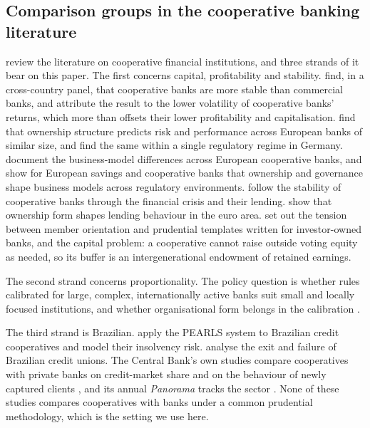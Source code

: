 \documentclass[11pt,a4paper]{article}
\begin{document}
\subsection{Comparison groups in the cooperative banking literature}

\citet{mckillop2020} review the literature on cooperative financial institutions, and
three strands of it bear on this paper. The first concerns capital, profitability and
stability. \citet{hesse2007} find, in a cross-country panel, that cooperative banks are
more stable than commercial banks, and attribute the result to the lower volatility of
cooperative banks' returns, which more than offsets their lower profitability and
capitalisation. \citet{iannotta2007} find that ownership structure predicts risk and
performance across European banks of similar size, and \citet{beck2009} find the same
within a single regulatory regime in Germany. \citet{ayadi2010} document the
business-model differences across European cooperative banks, and \citet{bulbul2013} show
for European savings and cooperative banks that ownership and governance shape business
models across regulatory environments. \citet{fiordelisi2014} follow the stability of
cooperative banks through the financial crisis and \citet{becchetti2016} their lending.
\citet{ferri2014} show that ownership form shapes lending behaviour in the euro area.
\citet{cuevas2006} set out the tension between member orientation and prudential
templates written for investor-owned banks, and \citet{fonteyne2007} the capital problem:
a cooperative cannot raise outside voting equity as needed, so its buffer is an
intergenerational endowment of retained earnings.

The second strand concerns proportionality. The policy question is whether rules
calibrated for large, complex, internationally active banks suit small and locally
focused institutions, and whether organisational form belongs in the calibration
\citep{bcbs2019, castrocarvalho2017, coelho2019}.

The third strand is Brazilian. \citet{bressan2011} apply the PEARLS system to Brazilian
credit cooperatives and model their insolvency risk. \citet{carvalho2015} analyse the
exit and failure of Brazilian credit unions. The Central Bank's own studies compare
cooperatives with private banks on credit-market share and on the behaviour of newly
captured clients \citep{bcb2018ee14, bcb2020ee91}, and its annual \textit{Panorama}
tracks the sector \citep{bcb2025panorama}. None of these studies compares cooperatives
with banks under a common prudential methodology, which is the setting we use here.
\end{document}
